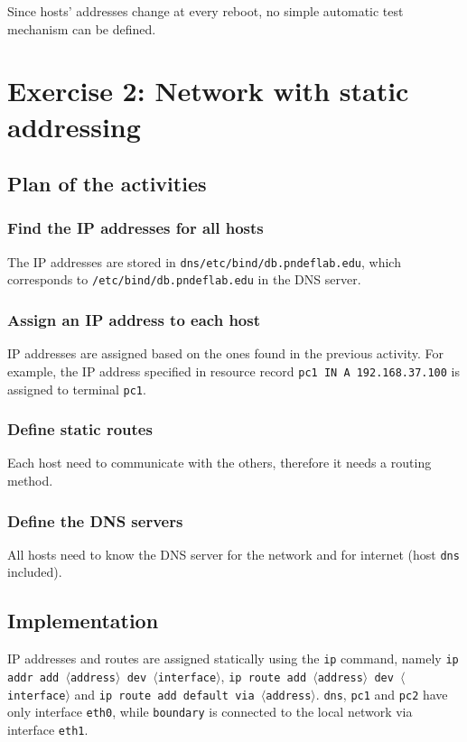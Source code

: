 \documentclass{homework}
\newcommand{\mt}{\texttt}
\begin{document}
    Since hosts' addresses change at every reboot, no simple automatic test mechanism can be defined.
    
    
    \section{Exercise 2: Network with static addressing}
    
    \subsection{Plan of the activities}
    
    \subsubsection{Find the IP addresses for all hosts}
    The IP addresses are stored in \mt{dns/etc/bind/db.pndeflab.edu}, which corresponds to \mt{/etc/bind/db.pndeflab.edu} in the DNS server.
    
    \subsubsection{Assign an IP address to each host}
    IP addresses are assigned based on the ones found in the previous activity. For example, the IP address specified in resource record \mt{pc1        IN      A       192.168.37.100} is assigned to terminal \mt{pc1}.
    
    \subsubsection{Define static routes}
    Each host need to communicate with the others, therefore it needs a routing method.
    
    \subsubsection{Define the DNS servers}
    All hosts need to know the DNS server for the network and for internet (host \mt{dns} included).
    
    \subsection{Implementation}
    IP addresses and routes are assigned statically using the \mt{ip} command, namely \mt{ip addr add $\langle$address$\rangle$ dev $\langle$interface$\rangle$}, \mt{ip route add $\langle$address$\rangle$ dev $\langle$interface$\rangle$} and \mt{ip route add default via $\langle$address$\rangle$}. \mt{dns}, \mt{pc1} and \mt{pc2} have only interface \mt{eth0}, while \mt{boundary} is connected to the local network via interface \mt{eth1}.
    
\end{document}
